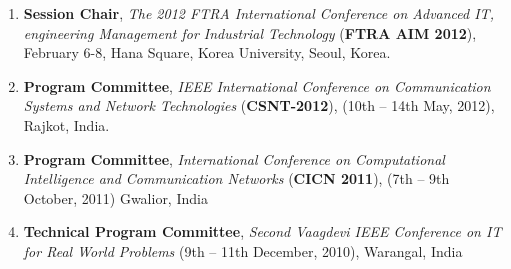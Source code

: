 \begin{enumerate}
\item
\textbf{Session Chair}, \textit{The 2012 FTRA International Conference on Advanced IT, engineering Management for Industrial Technology} (\textbf{FTRA AIM 2012}), February 6-8, Hana Square, Korea University, Seoul, Korea.

\item
\textbf{Program Committee}, \textit{IEEE International Conference on Communication Systems and Network Technologies} (\textbf{CSNT-2012}), (10th – 14th May, 2012), Rajkot, India.

\item
\textbf{Program Committee}, \textit{International Conference on Computational Intelligence and Communication Networks }(\textbf{CICN 2011}), (7th – 9th October, 2011) Gwalior, India

\item
\textbf{Technical Program Committee}, \textit{Second Vaagdevi IEEE Conference on IT for Real World Problems} (9th – 11th December, 2010), Warangal, India

\end{enumerate}